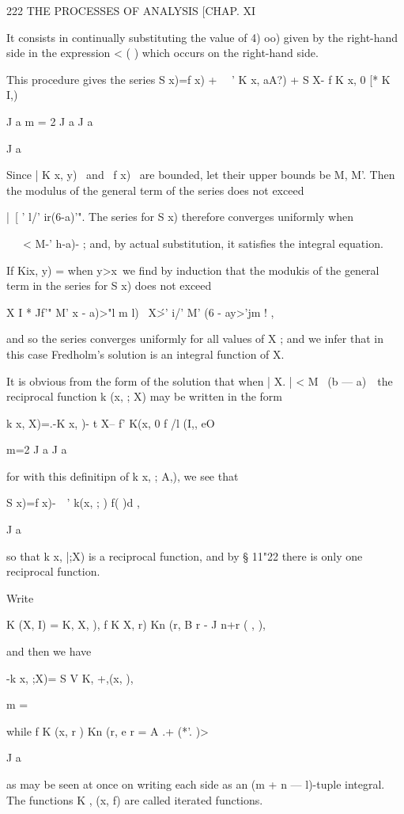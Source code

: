 {222 THE PROCESSES OF ANALYSIS [CHAP. XI

It consists in continually substituting the value of 4) oo) given by
the right-hand side in the expression < ( ) which occurs on the
right-hand side.

This procedure gives the series S x)=f x) + \ \ ' K x, aA?) + S X- f K
x, 0 [* K I,)

J a m = 2 J a J a

J a

Since | K x, y) \ and \ f x) \ are bounded, let their upper bounds be
M, M'. Then the modulus of the general term of the series does not
exceed

|\ [ ' l/' ir(6-a)'". The series for S x) therefore converges
uniformly when

\ \ \ < M-' h-a)- ; and, by actual substitution, it satisfies the
integral equation.

If Kix, y) = when y>x\ we find by induction that the modukis of the
general term in the series for S x) does not exceed

X I * Jf'" M' x - a)>"l m l) \ X\'>' i/' M' (6 - ay>'jm ! ,

and so the series converges uniformly for all values of X ; and we
infer that in this case Fredholm's solution is an integral function of
X.

It is obvious from the form of the solution that when | X. | < M~ (b —
a)~\ the reciprocal function k (x, ; X) may be written in the form

k x, X)=.-K x, )- t X-- f' K(x, 0 f /l (I,, eO

m=2 J a J a

for with this definitipn of k x, ; A,), we see that

S x)=f x)-\ \ ' k(x, ; ) f( )d ,

J a

so that k x, |;X) is a reciprocal function, and by § 11"22 there is
only one reciprocal function.

Write

K (X, I) = K, X, ), f K X, r) Kn (r, B r - J n+r ( , ),

and then we have

-k x, ;X)= S V K, +,(x, ),

m =

while f K (x, r ) Kn (r, e r = A .+ (*'. )>

J a

as may be seen at once on writing each side as an (m + n — l)-tuple
integral. The functions K , (x, f) are called iterated functions.



}
